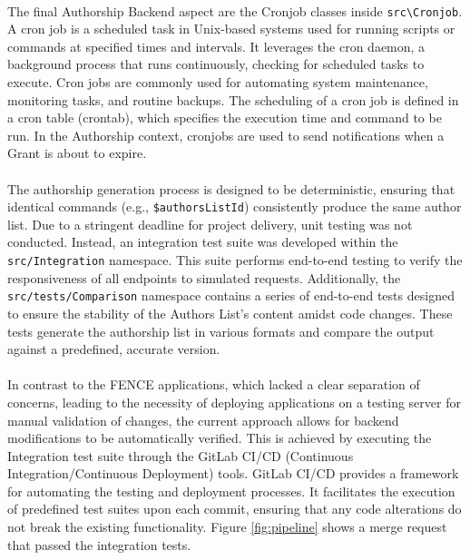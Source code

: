 \paragraph{} The final Authorship Backend aspect are the Cronjob classes inside \texttt{src\textbackslash Cron\-job}. A cron job is a scheduled task in Unix-based systems used for running scripts or commands at specified times and intervals. It leverages the cron daemon, a background process that runs continuously, checking for scheduled tasks to execute. Cron jobs are commonly used for automating system maintenance, monitoring tasks, and routine backups. The scheduling of a cron job is defined in a cron table (crontab), which specifies the execution time and command to be run. In the Authorship context, cronjobs are used to send notifications when a Grant is about to expire. 


\paragraph{} The authorship generation process is designed to be deterministic, ensuring that identical commands (e.g., \verb|$authorsListId|) consistently produce the same author list. Due to a stringent deadline for project delivery, unit testing was not conducted. Instead, an integration test suite was developed within the \verb|src/Integration| namespace. This suite performs end-to-end testing to verify the responsiveness of all endpoints to simulated requests. Additionally, the \verb|src/tests/Comparison| namespace contains a series of end-to-end tests designed to ensure the stability of the Authors List's content amidst code changes. These tests generate the authorship list in various formats and compare the output against a predefined, accurate version. 

\paragraph{} In contrast to the FENCE applications, which lacked a clear separation of concerns, leading to the necessity of deploying applications on a testing server for manual validation of changes, the current approach allows for backend modifications to be automatically verified. This is achieved by executing the Integration test suite through the GitLab CI/CD (Continuous Integration/Continuous Deployment) tools. GitLab CI/CD provides a framework for automating the testing and deployment processes. It facilitates the execution of predefined test suites upon each commit, ensuring that any code alterations do not break the existing functionality. Figure \ref{fig:pipeline} shows a merge request that passed the integration tests. 

